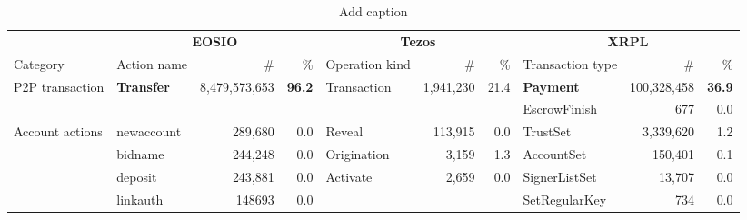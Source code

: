 \begin{table}[htbp]
	\centering
	\caption{Add caption}
	\begin{tabular}{llrrlrrlrr}
		\toprule
		                & \multicolumn{3}{c}{\textbf{EOSIO}} & \multicolumn{3}{c}{\textbf{Tezos}} & \multicolumn{3}{c}{\textbf{ XRPL }}                                                                                                                       \\
		Category        & Action name                        & \#                                 & \%                                  & Operation kind         & \#        & \%                  & Transaction type     & \#          & \%                  \\
		\cmidrule(r){1-1} \cmidrule(rl){2-4} \cmidrule(rl){5-7} \cmidrule(l){8-10}
		P2P transaction & \textbf{Transfer}                  & 8,479,573,653                      & \textbf{             96.2 }         & Transaction            & 1,941,230 & 21.4                & \textbf{Payment}     & 100,328,458 & \textbf{     36.9}  \\
		                &                                    &                                    &                                     &                        &           &                     & EscrowFinish         & 677         & 0.0                 \\
		\cmidrule(r){1-1} \cmidrule(rl){2-4} \cmidrule(rl){5-7} \cmidrule(l){8-10}
		Account actions & newaccount                         & 289,680                            & 0.0                                 & Reveal                 & 113,915   & 0.0                 & TrustSet             & 3,339,620   & 1.2                 \\
		                & bidname                            & 244,248                            & 0.0                                 & Origination            & 3,159     & 1.3                 & AccountSet           & 150,401     & 0.1                 \\
		                & deposit                            & 243,881                            & 0.0                                 & Activate               & 2,659     & 0.0                 & SignerListSet        & 13,707      & 0.0                 \\
		                & linkauth                           & 148693                             & 0.0                                 &                        &           &                     & SetRegularKey        & 734         & 0.0                 \\

\end{tabular}
\end{table}
